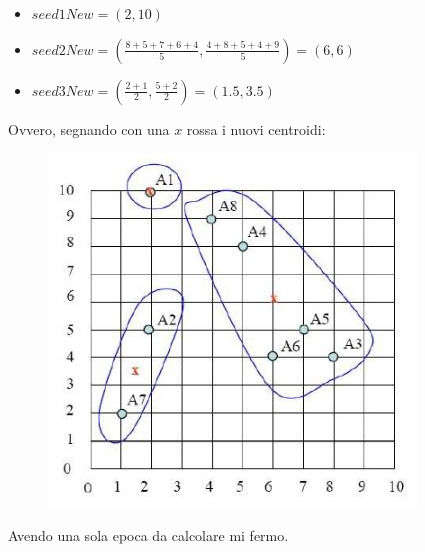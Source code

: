 \documentclass[a4paper,12pt, oneside]{book}
\begin{document}
\begin{esercizio}
\begin{itemize}
    \item $seed1New=(2,10)$
    \item $seed2New=\left(\frac{8+5+7+6+4}{5},\frac{4+8+5+4+9}{5}\right)=(6,6)$
    \item $seed3New=\left(\frac{2+1}{2},\frac{5+2}{2}\right)=(1.5,3.5)$
  \end{itemize}
  Ovvero, segnando con una $x$ rossa i nuovi centroidi:
  \begin{figure}[H]
    \centering
    \includegraphics[scale = 0.4]{img/clue3.jpg}
  \end{figure}
  Avendo una sola epoca da calcolare mi fermo.
\end{esercizio}
\end{document}
